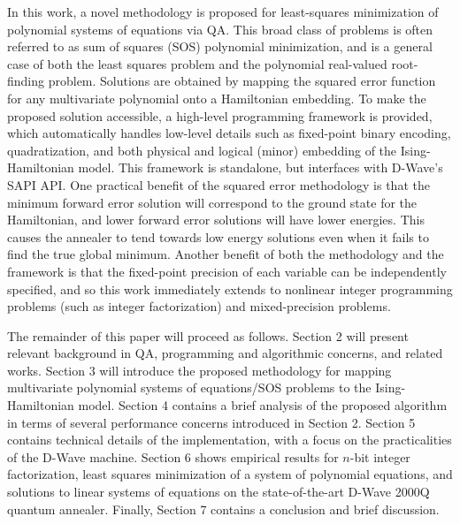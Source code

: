 In this work, a novel methodology is proposed for least-squares minimization of polynomial systems of equations via QA.
This broad class of problems is often referred to as sum of squares (SOS) polynomial minimization, and is a general case of both the least squares problem and the polynomial real-valued root-finding problem.
Solutions are obtained by mapping the squared error function for any multivariate polynomial onto a Hamiltonian embedding.
To make the proposed solution accessible, a high-level programming framework is provided, which automatically handles low-level details such as fixed-point binary encoding, quadratization, and both physical and logical (minor) embedding of the Ising-Hamiltonian model.
This framework is standalone, but interfaces with D-Wave's SAPI API.
One practical benefit of the squared error methodology is that the minimum forward error solution will correspond to the ground state for the Hamiltonian, and lower forward error solutions will have lower energies.
This causes the annealer to tend towards low energy solutions even when it fails to find the true global minimum.
Another benefit of both the methodology and the framework is that the fixed-point precision of each variable can be independently specified, and so this work immediately extends to nonlinear integer programming problems (such as integer factorization) and mixed-precision problems.

The remainder of this paper will proceed as follows.
Section 2 will present relevant background in QA, programming and algorithmic concerns, and related works.
Section 3 will introduce the proposed methodology for mapping multivariate polynomial systems of equations/SOS problems to the Ising-Hamiltonian model.
Section 4 contains a brief analysis of the proposed algorithm in terms of several performance concerns introduced in Section 2.
Section 5 contains technical details of the implementation, with a focus on the practicalities of the D-Wave machine.
Section 6 shows empirical results for $n$-bit integer factorization, least squares minimization of a system of polynomial equations, and solutions to linear systems of equations on the state-of-the-art D-Wave 2000Q quantum annealer.
Finally, Section 7 contains a conclusion and brief discussion.